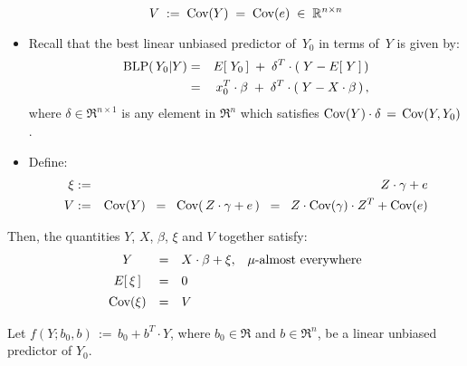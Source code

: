 \begin{theorem}
\begin{itemize}
	\begin{equation*}
	V \;:=\; \textnormal{Cov}(Y) \;=\; \textnormal{Cov}(e) \;\in\; \mathbb{R}^{n \times n}
	\end{equation*}
\item
	Recall that the best linear unbiased predictor of \,$Y_{0}$ in terms of \,$Y$ is given by:
	\begin{eqnarray*}
	\textnormal{BLP}(\,Y_{0}\vert Y)
	& = &
		E\!\left[\;Y_{0}\,\right] \; + \; \delta^{T}\cdot(\;Y - E\!\left[\;Y\,\right]\,)
	\\
	& = &
		x_{0}^{T}\cdot\beta \; + \; \delta^{T}\cdot(\;Y - X\cdot\beta\,)\,,
	\end{eqnarray*}
	where $\delta \in \Re^{n \times 1}$ is any element in $\Re^{n}$ which satisfies
	$\textnormal{Cov}(Y) \cdot \delta \,=\, \textnormal{Cov}(Y,Y_{0})$.
\item
	Define:
	\begin{eqnarray*}
	\xi & := & Z \cdot \gamma + e
	\\
	V & := & \textnormal{Cov}(Y) \;\; = \;\; \textnormal{Cov}\!\left(\,Z\cdot\gamma+e\,\right) \;\; = \;\; Z \cdot \textnormal{Cov}(\gamma) \cdot Z^{T} + \textnormal{Cov}(e)
	\end{eqnarray*}
\end{itemize}
Then, the quantities $Y$, $X$, $\beta$, $\xi$ and $V$ together satisfy:
	\begin{equation*}
	\begin{array}{ccll}
	Y & = & X \cdot \beta + \xi, & \textnormal{$\mu$-almost everywhere}
	\\
	E\!\left[\,\xi\,\right] &\overset{{\color{white}\vert}}{=}& 0
	\\
	\Cov\!\left(\xi\right) &\overset{{\color{white}\vert}}{=}& V
	\end{array}
	\end{equation*}
\end{theorem}
\proof
Let $f(Y;b_{0},b) \,:=\, b_{0} + b^{T}\cdot Y$, where $b_{0} \in \Re$ and $b \in \Re^{n}$, be a linear unbiased predictor of $Y_{0}$.

